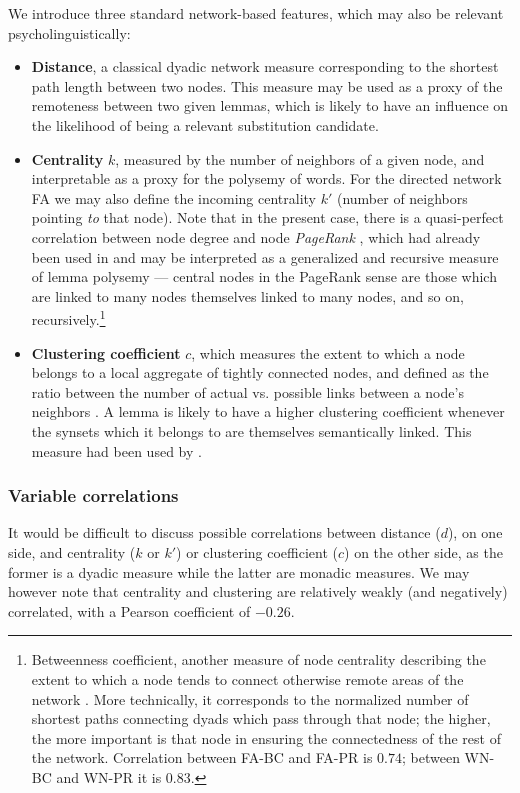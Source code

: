 \bigskip
We introduce three standard network-based features, which may also be relevant psycholinguistically:
\begin{itemize}
	\item \textbf{Distance}, a classical dyadic network measure corresponding to the shortest path length between two nodes. This measure may be used as a proxy of the remoteness between two given lemmas, which is likely to have an influence on the likelihood of being a relevant substitution candidate.
	\item \textbf{Centrality} $k$, measured by the number of neighbors of a given node, and interpretable as a proxy for the polysemy of words. For the directed network FA we may also define the incoming centrality $k'$ (number of neighbors pointing \emph{to} that node).  Note that in the present case, there is a quasi-perfect correlation between node degree and node \emph{PageRank} \cite{Page99}, which had already been used in \cite{Griffiths07} and may be interpreted as a generalized and recursive measure of lemma polysemy --- central nodes in the PageRank sense are those which are linked to many nodes themselves linked to many nodes, and so on, recursively.\footnote{{Betweenness coefficient}, another measure of node centrality describing the extent to which a node tends to connect otherwise remote areas of the network \cite{free:set}. More technically, it corresponds to the normalized number of shortest paths connecting dyads which pass through that node; the higher, the more important is that node in ensuring the connectedness of the rest of the network. Correlation between FA-BC and FA-PR is $0.74$; between WN-BC and WN-PR it is $0.83$.}
	\item \textbf{Clustering coefficient} $c$, which measures the extent to which a node belongs to a local aggregate of tightly connected nodes, and defined as the ratio between the number of actual vs. possible links between a node's neighbors \cite{watt-coll}. A lemma is likely to have a higher clustering coefficient whenever the synsets which it belongs to are themselves semantically linked. This measure had been used by \citet{Chan10}.
\end{itemize}

\subsubsection{Variable correlations}

It would be difficult to discuss possible correlations between distance ($d$), on one side, and centrality ($k$ or $k'$) or clustering coefficient ($c$) on the other side, as the former is a dyadic measure while the latter are monadic measures.  We may however note that centrality and clustering are relatively weakly (and negatively) correlated, with a Pearson coefficient of $-0.26$.

